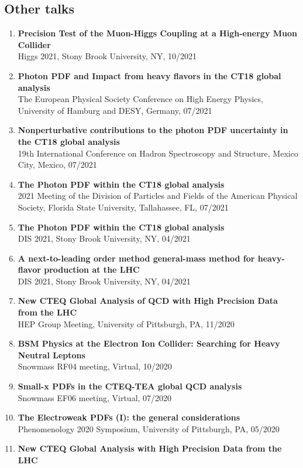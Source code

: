 \documentclass[12pt]{article}
\begin{document}
\subsection*{Other talks}
\begin{enumerate}
\item \textbf{Precision Test of the Muon-Higgs Coupling at a High-energy Muon Collider}\\
Higgs 2021, Stony Brook University, NY, 10/2021
\item \textbf{Photon PDF and Impact from heavy flavors in the CT18 global analysis}\\
The European Physical Society Conference on High Energy Physics, University of Hamburg and DESY, Germany, 07/2021
\item \textbf{Nonperturbative contributions to the photon PDF uncertainty in the CT18 global analysis}\\
19th International Conference on Hadron Spectroscopy and Structure, Mexico City, Mexico, 07/2021
\item \textbf{The Photon PDF within the CT18 global analysis}\\
2021 Meeting of the Division of Particles and Fields of the American Physical Society,  Florida State University, Tallahassee, FL, 07/2021 
\item \textbf{The Photon PDF within the CT18 global analysis}\\
DIS 2021, Stony Brook University, NY, 04/2021
\item \textbf{A next-to-leading order method general-mass method for heavy-flavor production at the LHC}\\
DIS 2021, Stony Brook University, NY, 04/2021
\item \textbf{New CTEQ Global Analysis of QCD with High Precision Data from the LHC}\\
HEP Group Meeting, University of Pittsburgh, PA, 11/2020
\item \textbf{BSM Physics at the Electron Ion Collider: Searching for Heavy Neutral Leptons}\\
Snowmass RF04 meeting, Virtual, 10/2020
\item \textbf{Small-x PDFs in the CTEQ-TEA global QCD analysis}\\
Snowmass EF06 meeting, Virtual, 07/2020
\item \textbf{The Electroweak PDFs (I): the general considerations}\\
Phenomenology 2020 Symposium, University of Pittsburgh, PA, 05/2020
\item \textbf{New CTEQ Global Analysis with High Precision Data from the LHC}\\

\end{enumerate}
\end{document}
